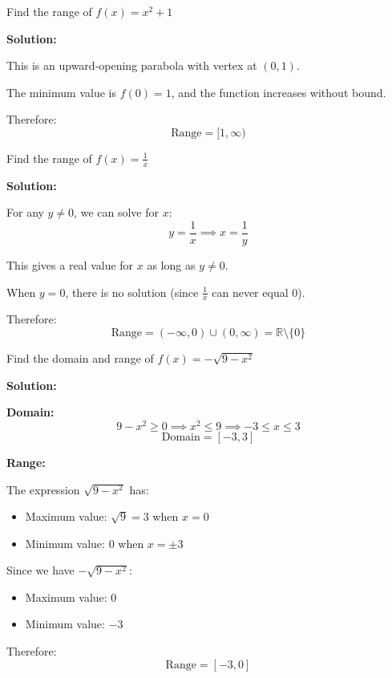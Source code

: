 \documentclass[12pt,a4paper]{article}
\begin{document}
\begin{example}
Find the range of $f(x) = x^2 + 1$

\textbf{Solution:}

This is an upward-opening parabola with vertex at $(0, 1)$.

The minimum value is $f(0) = 1$, and the function increases without bound.

Therefore:
\[
\text{Range} = [1, \infty)
\]

\begin{center}
\end{center}
\end{example}

\begin{example}
Find the range of $f(x) = \frac{1}{x}$

\textbf{Solution:}

For any $y \neq 0$, we can solve for $x$:
\[
y = \frac{1}{x} \implies x = \frac{1}{y}
\]

This gives a real value for $x$ as long as $y \neq 0$.

When $y = 0$, there is no solution (since $\frac{1}{x}$ can never equal 0).

Therefore:
\[
\text{Range} = (-\infty, 0) \cup (0, \infty) = \mathbb{R} \setminus \{0\}
\]
\end{example}

\begin{example}
Find the domain and range of $f(x) = -\sqrt{9 - x^2}$

\textbf{Solution:}

\textbf{Domain:}
\[
9 - x^2 \geq 0 \implies x^2 \leq 9 \implies -3 \leq x \leq 3
\]
\[
\text{Domain} = [-3, 3]
\]

\textbf{Range:}

The expression $\sqrt{9 - x^2}$ has:
\begin{itemize}
    \item Maximum value: $\sqrt{9} = 3$ when $x = 0$
    \item Minimum value: $0$ when $x = \pm 3$
\end{itemize}

Since we have $-\sqrt{9 - x^2}$:
\begin{itemize}
    \item Maximum value: $0$
    \item Minimum value: $-3$
\end{itemize}

Therefore:
\[
\text{Range} = [-3, 0]
\]
\end{example}
\end{document}
